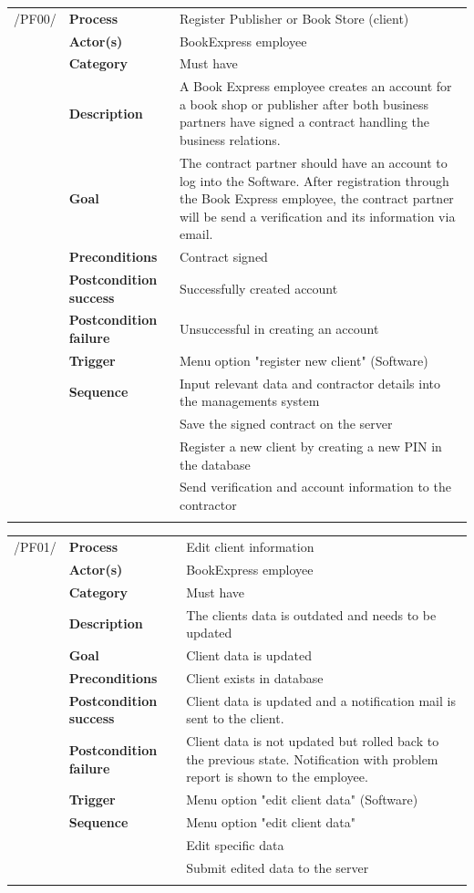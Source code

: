 \documentclass[11pt,a4paper,oneside,svgnames]{report}
\begin{document}
\noindent
\begin{tabular}{p{1.5cm}p{3cm}p{8cm}}
/PF00/	& \textbf{Process}	& Register Publisher or Book Store (client)\\
		& \textbf{Actor(s)} & BookExpress employee\\
		& \textbf{Category} & Must have\\
		& \textbf{Description}	 & A Book Express employee creates an account for a book shop or publisher after both business partners have signed a contract handling the business relations.\\
		& \textbf{Goal} & The contract partner should have an account to log into the Software. After registration through the Book Express employee, the contract partner will be send a verification and its 
		 information via email.\\
		& \textbf{Preconditions} & Contract signed\\
		& \textbf{Postcondition success} & Successfully created account\\
		& \textbf{Postcondition failure} & Unsuccessful in creating an account\\
		& \textbf{Trigger} & Menu option "register new client" (Software)\\
		& \textbf{Sequence} & Input relevant data and contractor details into the managements system\\
		& & Save the signed contract on the server\\
		& & Register a new client by creating a new PIN in the database\\
		& & Send verification and account information to the contractor\\
\hfill \\
\end{tabular}

\noindent
\begin{tabular}{p{1.5cm}p{3cm}p{8cm}}
/PF01/	& \textbf{Process} & Edit client information\\
		& \textbf{Actor(s)} & BookExpress employee\\
		& \textbf{Category} & Must have\\
		& \textbf{Description}	 & The clients data is outdated and needs to be updated\\
		& \textbf{Goal} & Client data is updated\\
		& \textbf{Preconditions} & Client exists in database\\
		& \textbf{Postcondition success} & Client data is updated and a notification mail is sent to the client.\\
		& \textbf{Postcondition failure} & Client data is not updated but rolled back to the previous state. Notification with problem report is shown to the employee.\\
		& \textbf{Trigger} & Menu option "edit client data" (Software)\\
		& \textbf{Sequence} & Menu option "edit client data"\\
		& & Edit specific data\\
		& & Submit edited data to the server\\
\hfill \\
\end{tabular}
\end{document}
